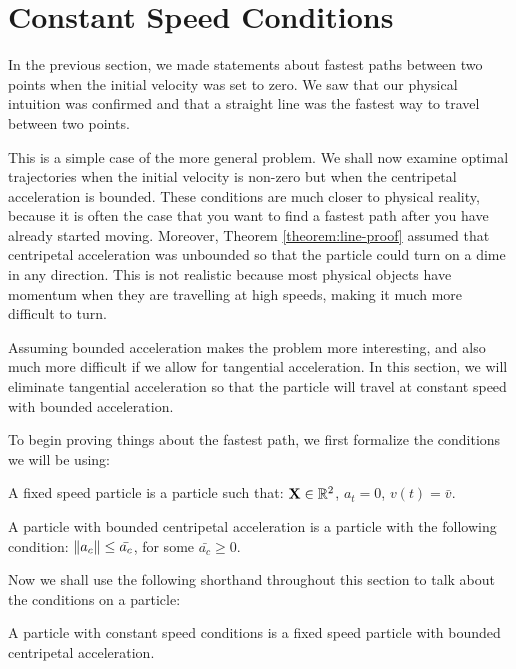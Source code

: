 
\section{Constant Speed Conditions}

In the previous section, we made statements about fastest paths between two points when the initial velocity was set to zero. We saw that our physical intuition was confirmed and that a straight line was the fastest way to travel between two points.

This is a simple case of the more general problem. We shall now examine optimal trajectories when the initial velocity is non-zero but when the centripetal acceleration is bounded. These conditions are much closer to physical reality, because it is often the case that you want to find a fastest path after you have already started moving. Moreover, Theorem \ref{theorem:line-proof} assumed that centripetal acceleration was unbounded so that the particle could turn on a dime in any direction. This is not realistic because most physical objects have momentum when they are travelling at high speeds, making it much more difficult to turn.

Assuming bounded acceleration makes the problem more interesting, and also much more difficult if we allow for tangential acceleration. In this section, we will eliminate tangential acceleration so that the particle will travel at constant speed with bounded acceleration.

To begin proving things about the fastest path, we first formalize the conditions we will be using:

\begin{definition}
  A fixed speed particle is a particle such that: $\mathbf{X} \in \mathbb R^2$, $a_t = 0$, $v(t) = \bar{v}$.
\end{definition}

\begin{definition}
  A particle with bounded centripetal acceleration is a particle with the following condition: $\norm{a_c} \le \bar{a_c}$, for some $\bar{a_c} \ge 0$.
\end{definition}

Now we shall use the following shorthand throughout this section to talk about the conditions on a particle:

\begin{definition}
  A particle with constant speed conditions is a fixed speed particle with bounded centripetal acceleration.
\end{definition}

